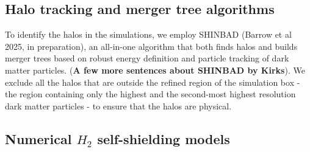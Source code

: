 \documentclass[linenumbers, twocolumn]{aastex631}
\begin{document}


\subsection{Halo tracking and merger tree algorithms} \label{sec:halotracking}

To identify the halos in the simulations, we employ SHINBAD (Barrow et al 2025, in preparation), an all-in-one algorithm that both finds halos and builds merger trees based on robust energy definition and particle tracking of dark matter particles. (\textbf{A few more sentences about SHINBAD by Kirks}). We exclude all the halos that are outside the refined region of the simulation box - the region containing only the highest and the second-most highest resolution dark matter particles - to ensure that the halos are physical.

\subsection{Numerical $H_{2}$ self-shielding models}
\end{document}
